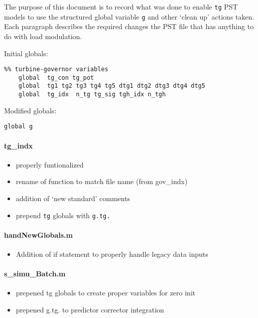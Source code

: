 \documentclass[12pt]{article}
\begin{document}
The purpose of this document is to record what was done to enable \verb|tg| PST models to use the structured global variable \verb|g| and other `clean up' actions taken.
Each paragraph describes the required changes the PST file that has anything to do with load modulation.

Initial globals:
\begin{verbatim}
%% turbine-governor variables
    global  tg_con tg_pot
    global  tg1 tg2 tg3 tg4 tg5 dtg1 dtg2 dtg3 dtg4 dtg5
    global  tg_idx  n_tg tg_sig tgh_idx n_tgh

\end{verbatim}

Modified globals:
\begin{verbatim}
global g
\end{verbatim}

\paragraph{tg\_indx}
	\begin{itemize}
		\item properly funtionalized
		\item rename of function to match file name (from gov\_indx)
		\item addition of `new standard' comments
		\item prepend \verb|tg| globals with \verb|g.tg.|
	\end{itemize}


\paragraph{handNewGlobals.m}
	\begin{itemize}
		\item Addition of if statement to properly handle legacy data inputs
	\end{itemize}


\paragraph{s\_simu\_Batch.m}
	\begin{itemize}
		\item prepened tg globals to create proper variables for zero init
		\item prepened g.tg. to predictor corrector integration
	\end{itemize}
\end{document}
